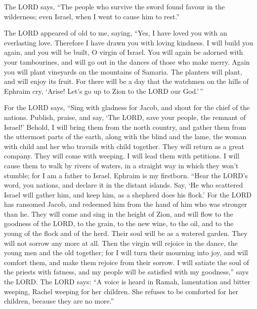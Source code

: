  The LORD says, ``The people who survive the sword found
favour in the wilderness; even Israel, when I went to cause him to
rest.''

 The LORD appeared of old to me, saying, ``Yes, I have loved
you with an everlasting love. Therefore I have drawn you with loving
kindness.  I will build you again, and you will be built, O
virgin of Israel. You will again be adorned with your tambourines, and
will go out in the dances of those who make merry.  Again
you will plant vineyards on the mountains of Samaria. The planters will
plant, and will enjoy its fruit.  For there will be a day
that the watchmen on the hills of Ephraim cry, `Arise! Let's go up to
Zion to the LORD our God.'\,''

 For the LORD says, ``Sing with gladness for Jacob, and
shout for the chief of the nations. Publish, praise, and say, `The LORD,
save your people, the remnant of Israel!'  Behold, I will
bring them from the north country, and gather them from the uttermost
parts of the earth, along with the blind and the lame, the woman with
child and her who travails with child together. They will return as a
great company.  They will come with weeping. I will lead
them with petitions. I will cause them to walk by rivers of waters, in a
straight way in which they won't stumble; for I am a father to Israel.
Ephraim is my firstborn.  ``Hear the LORD's word, you
nations, and declare it in the distant islands. Say, `He who scattered
Israel will gather him, and keep him, as a shepherd does his flock.'
 For the LORD has ransomed Jacob, and redeemed him from the
hand of him who was stronger than he.  They will come and
sing in the height of Zion, and will flow to the goodness of the LORD,
to the grain, to the new wine, to the oil, and to the young of the flock
and of the herd. Their soul will be as a watered garden. They will not
sorrow any more at all.  Then the virgin will rejoice in
the dance, the young men and the old together; for I will turn their
mourning into joy, and will comfort them, and make them rejoice from
their sorrow.  I will satiate the soul of the priests with
fatness, and my people will be satisfied with my goodness,'' says the
LORD.  The LORD says: ``A voice is heard in Ramah,
lamentation and bitter weeping, Rachel weeping for her children. She
refuses to be comforted for her children, because they are no more.''

